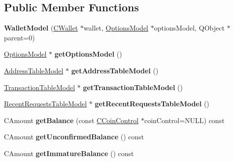 \subsection*{Public Member Functions}
\begin{DoxyCompactItemize}
\item 
\mbox{\label{class_wallet_model_af50d9654d2f20e4e4f0789dcb64ad6b1}} 
{\bfseries Wallet\+Model} (\mbox{\hyperlink{class_c_wallet}{C\+Wallet}} $\ast$wallet, \mbox{\hyperlink{class_options_model}{Options\+Model}} $\ast$options\+Model, Q\+Object $\ast$parent=0)
\item 
\mbox{\label{class_wallet_model_a96d53e56b3f8f07537ea2523f7a7d300}} 
\mbox{\hyperlink{class_options_model}{Options\+Model}} $\ast$ {\bfseries get\+Options\+Model} ()
\item 
\mbox{\label{class_wallet_model_a89ed202e2dbc04aaa70d72872b95b351}} 
\mbox{\hyperlink{class_address_table_model}{Address\+Table\+Model}} $\ast$ {\bfseries get\+Address\+Table\+Model} ()
\item 
\mbox{\label{class_wallet_model_afe9f7d149f1e8335033c69dab1dc277d}} 
\mbox{\hyperlink{class_transaction_table_model}{Transaction\+Table\+Model}} $\ast$ {\bfseries get\+Transaction\+Table\+Model} ()
\item 
\mbox{\label{class_wallet_model_ab13ca64220a1652d63e1e042d3be578f}} 
\mbox{\hyperlink{class_recent_requests_table_model}{Recent\+Requests\+Table\+Model}} $\ast$ {\bfseries get\+Recent\+Requests\+Table\+Model} ()
\item 
\mbox{\label{class_wallet_model_a4d2cb225a19b89c64f4b5d81faf89beb}} 
C\+Amount {\bfseries get\+Balance} (const \mbox{\hyperlink{class_c_coin_control}{C\+Coin\+Control}} $\ast$coin\+Control=N\+U\+LL) const
\item 
\mbox{\label{class_wallet_model_a5028f20a33e0d17942abeea537916736}} 
C\+Amount {\bfseries get\+Unconfirmed\+Balance} () const
\item 
\mbox{\label{class_wallet_model_ac5dbbc28b2c8ecd2e00fb45c6a2cb6f8}} 
C\+Amount {\bfseries get\+Immature\+Balance} () const

\end{DoxyCompactItemize}
